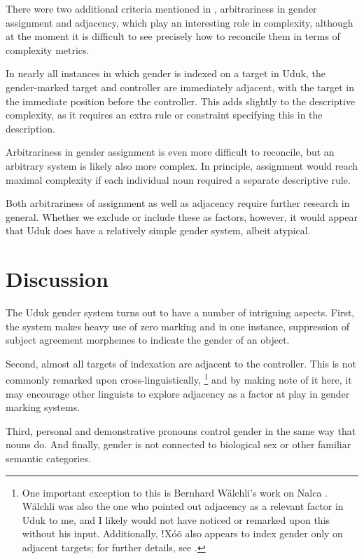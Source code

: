 \documentclass[output=collectionpaper,hidelinks]{langscibook}
\theoremstyle{remark}
\begin{document}
There were two additional criteria mentioned in ,
arbitrariness in gender assignment and adjacency, which play an interesting role
in complexity, although at the moment it is difficult to see precisely how to
reconcile them in terms of complexity metrics.

In nearly all instances in which gender is indexed on a target in Uduk, the
gender-marked target and controller are immediately adjacent, with the target in
the immediate position before the controller.  This adds slightly to the
descriptive complexity, as it requires an extra rule or constraint specifying
this in the description.

Arbitrariness in gender assignment is even more difficult to reconcile, but an
arbitrary system is likely also more complex.  In principle, assignment would
reach maximal complexity if each individual noun required a separate descriptive
rule.

Both arbitrariness of assignment as well as adjacency require further research
in general.  Whether we exclude or include these as factors, however, it would
appear that Uduk does have a relatively simple gender system, albeit atypical.

\section{Discussion}
\label{sec:Discussion}

The Uduk gender system turns out to have a number of intriguing aspects.
First, the system makes heavy use of zero marking and in one instance,
suppression of subject agreement morphemes to indicate the gender of an object.

Second, almost all targets of indexation are adjacent to the controller. This
is not commonly remarked upon cross-linguistically,%
\footnote{One important exception to this is Bernhard Wälchli's work on Nalca
\citep{Waelchli2018}.  Wälchli was also the one who pointed out
adjacency as a relevant factor in Uduk to me, and I likely would not have
noticed or remarked upon this without his input.  Additionally, ǃXóõ also
appears to index gender only on adjacent targets; for further details, see
\citet{Gueldemann2006}.} %
and by making note of it here, it may encourage other linguists to explore
adjacency as a factor at play in gender marking systems.

Third, personal and demonstrative pronouns control gender in the same way that
nouns do.  And finally, gender is not connected to biological sex or other
familiar semantic categories.
\end{document}
